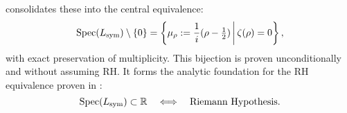 \medskip

 consolidates these into the central equivalence:
\[
\operatorname{Spec}(L_{\mathrm{sym}}) \setminus \{0\} = \left\{ \mu_\rho := \frac{1}{i}(\rho - \tfrac{1}{2}) \,\middle|\, \zeta(\rho) = 0 \right\},
\]
with exact preservation of multiplicity. This bijection is proven unconditionally and without assuming RH. It forms the analytic foundation for the RH equivalence proven in :
\[
\operatorname{Spec}(L_{\mathrm{sym}}) \subset \mathbb{R} \quad \Longleftrightarrow \quad \text{Riemann Hypothesis}.
\]
